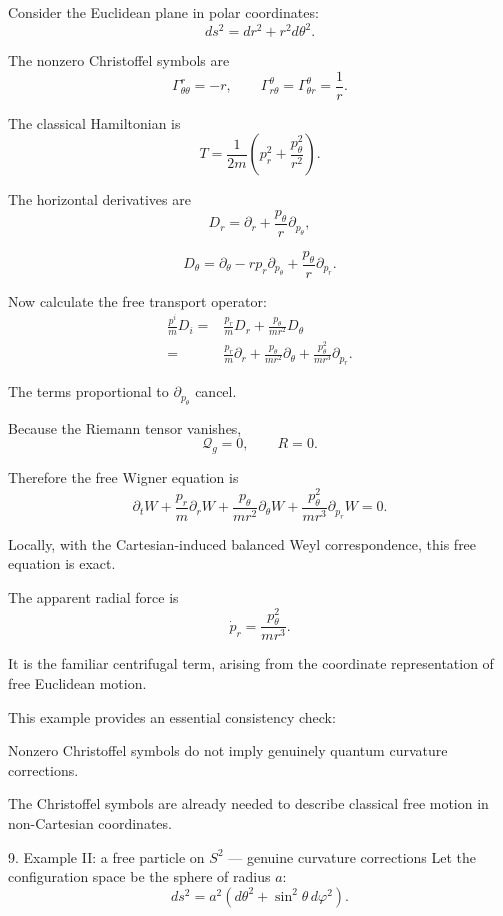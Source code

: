 Consider the Euclidean plane in polar coordinates:
\[
ds^2=dr^2+r^2d\theta^2.
\tag{55}
\]

The nonzero Christoffel symbols are
\[
\Gamma^r_{\theta\theta}=-r,
\qquad
\Gamma^\theta_{r\theta}
=\Gamma^\theta_{\theta r}=\frac1r.
\tag{56}
\]

The classical Hamiltonian is
\[
T=\frac1{2m}\left(p_r^2+\frac{p_\theta^2}{r^2}\right).
\tag{57}
\]

The horizontal derivatives are
\[
D_r=
\partial_r+\frac{p_\theta}{r}\partial_{p_\theta},
\tag{58}
\]

\[
D_\theta=
\partial_\theta-rp_r\partial_{p_\theta}
+\frac{p_\theta}{r}\partial_{p_r}.
\tag{59}
\]

Now calculate the free transport operator:
\[
\begin{aligned}
\frac{p^i}{m}D_i
={}&
\frac{p_r}{m}D_r
+\frac{p_\theta}{mr^2}D_\theta\\
={}&
\frac{p_r}{m}\partial_r
+\frac{p_\theta}{mr^2}\partial_\theta
+\frac{p_\theta^2}{mr^3}\partial_{p_r}.
\end{aligned}
\tag{60}
\]

The terms proportional to \(\partial_{p_\theta}\) cancel.

Because the Riemann tensor vanishes,
\[
\mathcal Q_g=0,
\qquad R=0.
\]

Therefore the free Wigner equation is
\[
\boxed{
\partial_tW+
\frac{p_r}{m}\partial_rW+
\frac{p_\theta}{mr^2}\partial_\theta W+
\frac{p_\theta^2}{mr^3}\partial_{p_r}W=0.
}
\tag{61}
\]

Locally, with the Cartesian-induced balanced Weyl correspondence, this free equation is exact.

The apparent radial force is
\[
\dot p_r=\frac{p_\theta^2}{mr^3}.
\tag{62}
\]

It is the familiar centrifugal term, arising from the coordinate representation of free Euclidean motion.

This example provides an essential consistency check:

Nonzero Christoffel symbols do not imply genuinely quantum curvature corrections.

The Christoffel symbols are already needed to describe classical free motion in non-Cartesian coordinates.

9. Example II: a free particle on \(S^2\) — genuine curvature corrections
Let the configuration space be the sphere of radius \(a\):
\[
ds^2=a^2(d\theta^2+\sin^2\theta\,d\varphi^2).
\tag{63}
\]

